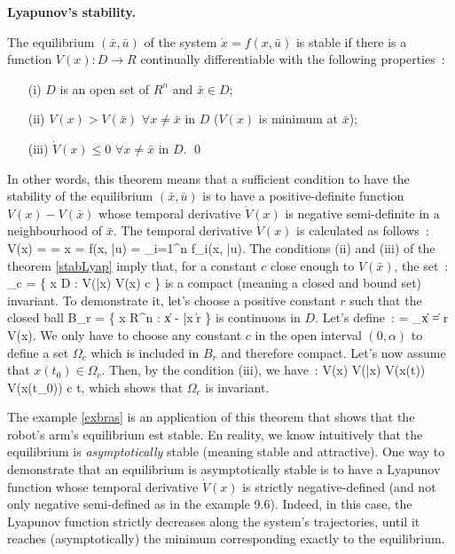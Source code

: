 \begin{theoreme}\label{stabLyap}{\bf \og Lyapunov's \fg stability.}

The equilibrium $(\bar x, \bar u)$ of the system $\dot x = f(x,\bar u)$ is stable if there is a function $V(x): D \rightarrow R$ continually differentiable with the following properties~:\\
\begin{itemize}
\item[(i)] $D$ is an open set of $R^n$ and $\bar x \in D$;\\
\item[(ii)] $V(x) > V(\bar x)$ $\forall x \neq \bar x$ in $D$ ($V(x)$ is minimum at $\bar x$);\\
\item[(iii)] $\dot V(x) \leq 0$ $\forall x \neq \bar x$ in $D$. \qed
\end{itemize}
\end{theoreme}
In other words, this theorem means that a sufficient condition to have the stability of the equilibrium $(\bar x, \bar u)$ is to have a positive-definite function $V(x) - V(\bar x)$ whose temporal derivative $\dot V(x)$ is negative semi-definite in a neighbourhood of $\bar x$. The temporal derivative $\dot V(x)$ is calculated as follows~:
\eqnn
\dot V(x) =  =  \dot x =  f(x, \bar u) = \sum_{i=1}^n  f_i(x, \bar u).
\eeqnn
The conditions (ii) and (iii) of the theorem \ref{stabLyap} imply that, for a constant $c$ close enough to $V(\bar x)$, the set~:
\eqnn
\Omega_c = \{ x \in D : V(\bar x) \leq V(x) \leq c \}
\eeqnn
is a compact (meaning a closed and bound set) invariant. To demonstrate it, 
let's choose a positive constant $r$ such that the closed ball
\eqnn
B_r = \{ x \in R^n :  \| x - \bar x \| \leq r \}
\eeqnn
is continuous in $D$. Let's define~:
\eqnn
\alpha = \min_{\| x \| = r} V(x).
\eeqnn
We only have to choose any constant $c$ in the open interval $(0,\alpha)$ to define a set $\Omega_c$ which is included in $B_r$ and therefore compact. Let's now assume that $x(t_0) \in \Omega_c$. Then, by the condition (iii), we have~:
\eqnn
\dot V(x)  \;\;\; \Rightarrow \;\;\; V(\bar x) \leq V(x(t)) \leq V(x(t_0)) \leq c \;\;\; \forall t,
\eeqnn
which shows that $\Omega_c$ is invariant.

The example \ref{exbras} is an application of this theorem that shows that the robot's arm's equilibrium est stable. En reality, we know intuitively that the equilibrium is {\em asymptotically} stable (meaning stable and attractive). One way to demonstrate that an equilibrium is asymptotically stable is to have a Lyapunov function whose temporal derivative $ \dot V(x)$ is strictly negative-defined (and not only negative semi-defined as in the example 9.6). Indeed, in this case, the Lyapunov function strictly decreases along the system's trajectories, until it reaches (asymptotically) the minimum corresponding exactly to the equilibrium.

